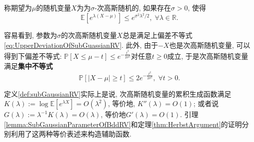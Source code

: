 \begin{definition}[次高斯随机变量]\label{def:subGaussianRV}
	称期望为$\mu$的随机变量$X$为为$\sigma$-次高斯随机的, 如果存在$\sigma > 0$, 使得
	\begin{equation*}
		\mathbb{E}[e^{\lambda(X - \mu)}] \leq e^{\sigma^2 \lambda^2 /2},\; \forall \lambda \in \mathbb{R}.   
	\end{equation*}  
\end{definition}
容易看到, 参数为$\sigma$的次高斯随机变量$X$总是满足上偏差不等式 \eqref{eq:UpperDeviationOfSubGuassianRV}.  
此外, 由于$-X$也是次高斯随机变量, 可以得到下偏差不等式: $\mathbb{P}[X \leq \mu - t] \leq e^{- \frac{t^2}{2 \sigma^2}}$对任意$t \geq 0$成立, 于是次高斯随机变量满足\textbf{集中不等式}
\begin{equation}\label{eq:SubGuassianConcentration}
	\mathbb{P}[|X - \mu| \geq t] \leq 2 e^{- \frac{t^2}{2 \sigma^2}},\; \forall t > 0. 
\end{equation}

\begin{remark}[辅助函数的构造]
	定义\ref{def:subGaussianRV}实际上是说, 次高斯随机变量的累积生成函数满足$K(\lambda) := \log \mathbb{E}[e^{\lambda X}] = O(\lambda^2)$, 等价地, $K''(\lambda) = O(1)$; 
	或者说$G(\lambda) := \lambda^{-1} K(\lambda) = O(\lambda)$, 等价地$G'(\lambda) = O(1)$. 
	引理\ref{lemma:SubGaussianParameterOfBddRV}和定理\ref{thm:HerbstArgument}的证明分别利用了这两种等价表述来构造辅助函数. 
\end{remark}

